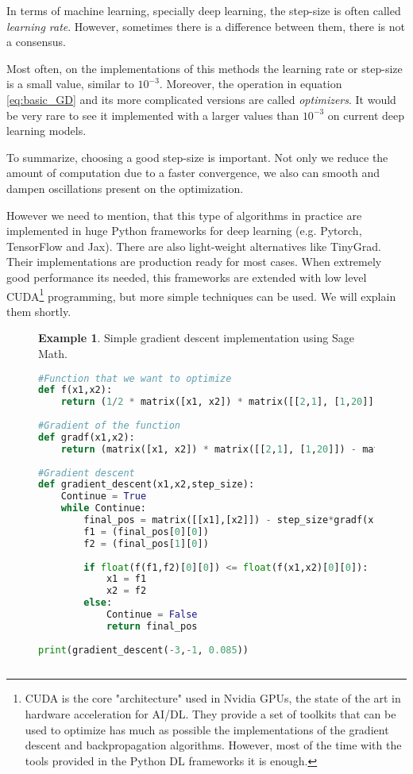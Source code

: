 \documentclass[]{article}
\theoremstyle{definition}
\newtheorem{exmp}{Example}[section]
\begin{document}
In terms of machine learning, specially deep learning, the step-size is often called \textit{learning rate}. However, sometimes there is a difference between them, there is not a consensus.

 Most often, on the implementations of this methods the learning rate or step-size is a small value, similar to $10^{-3}$. Moreover, the operation in equation \ref{eq:basic_GD} and its more complicated versions are called \textit{optimizers}. It would be very rare to see it implemented with a larger values than $10^{-3}$ on current deep learning models.

To summarize, choosing a good step-size is important. Not only we reduce the amount of computation due to a faster convergence, we also can smooth and dampen oscillations present on the optimization.

However we need to mention, that this type of algorithms in practice are implemented in huge Python frameworks for deep learning (e.g. Pytorch, TensorFlow and Jax). There are also light-weight alternatives like TinyGrad. Their implementations are production ready for most cases. When extremely good performance its needed, this frameworks are extended with low level CUDA\footnote{CUDA is the core "architecture" used in Nvidia GPUs, the state of the art in hardware acceleration for AI/DL. They provide a set of toolkits that can be used to optimize has much as possible the implementations of the gradient descent and backpropagation algorithms. However, most of the time with the tools provided in the Python DL frameworks it is enough.} programming, but more simple techniques can be used. We will explain them shortly. 
\begin{figure}[h]
	\begin{exmp}
		Simple gradient descent implementation using Sage Math.
		\begin{lstlisting}[language=python]
#Function that we want to optimize
def f(x1,x2):
	return (1/2 * matrix([x1, x2]) * matrix([[2,1], [1,20]]) * matrix([[x1], [x2]]) - matrix([5,3]) * matrix([[x1], [x2]]))
			
#Gradient of the function
def gradf(x1,x2):
	return (matrix([x1, x2]) * matrix([[2,1], [1,20]]) - matrix([5,3]))
			
#Gradient descent
def gradient_descent(x1,x2,step_size):
	Continue = True
	while Continue:
		final_pos = matrix([[x1],[x2]]) - step_size*gradf(x1,x2).transpose()
		f1 = (final_pos[0][0])
		f2 = (final_pos[1][0])
			
		if float(f(f1,f2)[0][0]) <= float(f(x1,x2)[0][0]):
			x1 = f1
			x2 = f2
		else:
			Continue = False
			return final_pos
			
print(gradient_descent(-3,-1, 0.085))
			
		\end{lstlisting}
	\end{exmp}
\end{figure}
\end{document}

